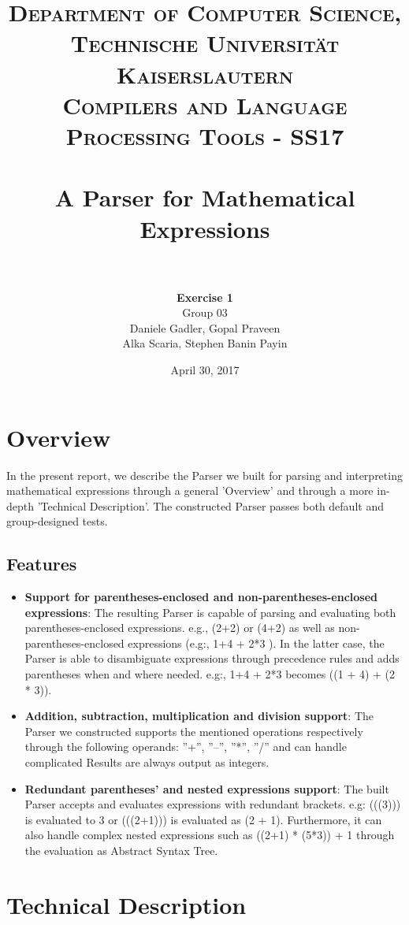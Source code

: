 \documentclass[paper=a4, fontsize=11pt]{scrartcl}
\title{
		\usefont{OT1}{bch}{b}{n}
		\normalfont \normalsize \textsc{Department of Computer Science, Technische Universit\"at Kaiserslautern\\
Compilers and Language Processing Tools - SS17
		} \\ [2pt]
		\horrule{0.5pt} \\[0.4cm]
		\huge A Parser for Mathematical Expressions\\
		\horrule{2pt} \\[0.5cm]
}
\author{	
		\textbf{Exercise 1}\\
		Group 03\\
        Daniele Gadler, Gopal Praveen\\Alka Scaria, Stephen Banin Payin \\[-1pt]		\normalsize
}
\date{April 30, 2017}
\numberwithin{equation}{section}		%
\numberwithin{figure}{section}			%
\numberwithin{table}{section}				%
\begin{document}
\maketitle

\section*{Overview}
In the present report, we describe the Parser we built for parsing and interpreting mathematical expressions through a general 'Overview' and through a more in-depth 'Technical Description'. The constructed Parser passes both default and group-designed tests.
\subsection*{Features}

\begin{itemize}
	\item \textbf{Support for parentheses-enclosed and non-parentheses-enclosed expressions}: The resulting Parser is capable of parsing and evaluating both parentheses-enclosed expressions. e.g., (2+2) or (4+2) as well as non-parentheses-enclosed expressions (e.g:, 1+4 + 2*3 ). In the latter case, the Parser is able to disambiguate expressions through precedence rules and adds parentheses when and where needed. e.g:, 1+4 + 2*3 becomes ((1 + 4) + (2 * 3)).
	\item \textbf{Addition, subtraction, multiplication and division support}: The Parser we constructed supports the mentioned operations respectively through the following operands: ''+'', ''--'', ''*'', ''/'' and can handle complicated Results are always output as integers. 
	\item \textbf{Redundant parentheses' and nested expressions support}: The built Parser accepts and evaluates expressions with redundant brackets. e.g: (((3))) is evaluated to 3 or (((2+1))) is evaluated as (2 + 1). Furthermore, it can also handle complex nested expressions such as ((2+1) * (5*3)) + 1 through the evaluation as Abstract Syntax Tree. 
\end{itemize}


\section*{Technical Description}

\end{document}
